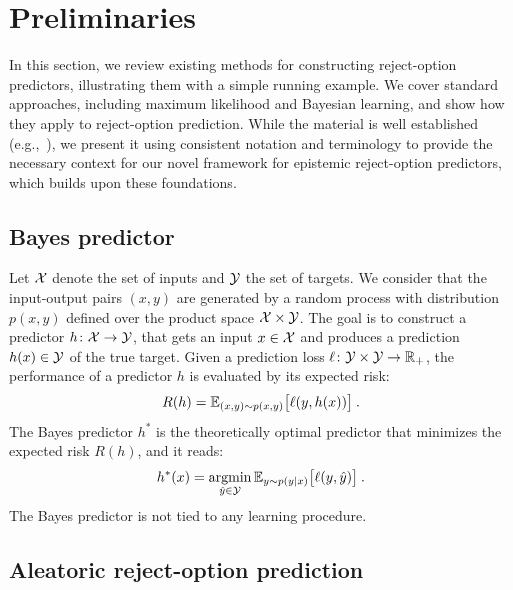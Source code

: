 \section{Preliminaries }

In this section, we review existing methods for constructing reject-option predictors, illustrating them with a simple running example. We cover standard approaches, including maximum likelihood and Bayesian learning, and show how they apply to reject-option prediction. While the material is well established (e.g.,~\cite{Bishop-PRML-2006}), we present it using consistent notation and terminology to provide the necessary context for our novel framework for epistemic reject-option predictors, which builds upon these foundations.

\subsection{Bayes predictor}

Let ${\cal X}$ denote the set of inputs and ${\cal Y}$ the set of targets. We consider that the input-output pairs $(x, y)$ are generated by a random process with distribution $p(x, y)$ defined over the product space ${\cal X} \times {\cal Y}$. The goal is to construct a predictor $h\colon{\cal X}\rightarrow{\cal Y}$, that gets an input  $x\in{\cal X}$ and produces a prediction $h(x)\in{\cal Y}$ of the true target. Given a prediction loss $\ell \colon{\cal Y}\times{\cal Y}\rightarrow\mathbb{R}_+$, the performance of a predictor $h$ is evaluated by its expected risk:
\[
    R(h) = {\mathbb{E}}_{(x,y)\sim p(x,y)}\big [ \ell(y,h(x)) \big ]
\:.
\]
%
The Bayes predictor $h^*$ is the theoretically optimal predictor that minimizes the expected risk $R(h)$, and it reads:
\begin{equation}
\label{equ:BayesPredictor}
   h^*(x) = \mathop{\rm argmin}_{\hat{y}\in{\cal Y}} {\mathbb{E}}_{y\sim p(y|x)}\big [ \ell(y,\hat{y})\big ] \:.
\end{equation}
% 
The Bayes predictor is not tied to any learning procedure.

\subsection{Aleatoric reject-option prediction}

